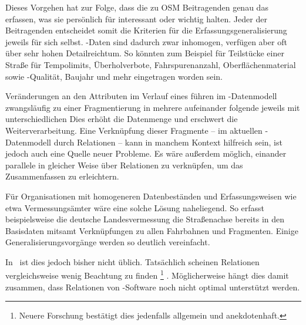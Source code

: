 \documentclass[../main/thesis.tex]{subfiles}
\begin{document}
Dieses Vorgehen hat
zur Folge, dass die zu OSM Beitragenden genau das erfassen, was sie persönlich für interessant oder wichtig halten. 
Jeder der Beitragenden entscheidet somit die Kriterien für die Erfassungsgeneralisierung jeweils für sich selbst.
\osm-Daten sind dadurch zwar inhomogen, verfügen aber oft über sehr hohen Detailreichtum.
So könnten zum Beispiel für Teilstücke einer Straße  für Tempolimits, Überholverbote, Fahrspurenanzahl, Oberflächenmaterial sowie -Qualität, Baujahr und mehr eingetragen worden sein. 



Veränderungen an den Attributen im Verlauf eines  führen im \osm-Datenmodell zwangsläufig zu einer Fragmentierung in mehrere aufeinander folgende  jeweils mit unterschiedlichen 
Dies erhöht die Datenmenge und erschwert die Weiterverarbeitung.
Eine Verknüpfung dieser Fragmente -- im aktuellen \osm-Datenmodell durch Relationen -- kann in manchem Kontext hilfreich sein, ist jedoch auch eine Quelle neuer Probleme. 
Es wäre außerdem möglich, einander parallele  in gleicher Weise über Relationen zu verknüpfen, um das Zusammenfassen zu erleichtern.

Für Organisationen mit homogeneren Datenbeständen und Erfassungsweisen wie etwa Vermessungsämter wäre eine solche Lösung naheliegend.
So erfasst beispielsweise die deutsche Landesvermessung die Straßenachse bereits in den Basisdaten mitsamt Verknüpfungen zu allen Fahrbahnen und Fragmenten. 
Einige Generalisierungsvorgänge werden so deutlich vereinfacht. 

In \osm\ ist dies jedoch bisher nicht üblich.
Tatsächlich scheinen Relationen vergleichsweise wenig Beachtung zu finden%
\footnote{Neuere Forschung bestätigt dies jedenfalls allgemein und anekdotenhaft. }%
.
Möglicherweise hängt dies damit zusammen, dass Relationen von \osm-Software noch nicht optimal  unterstützt werden. 
\end{document}
